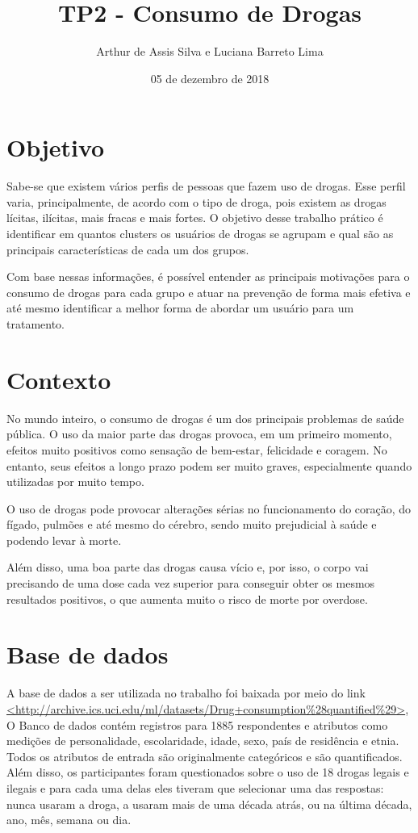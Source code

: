 \documentclass{article}
\title{TP2 - Consumo de Drogas}
\author{Arthur de Assis Silva e Luciana Barreto Lima}
\date{05 de dezembro de 2018}
\begin{document}
\maketitle

\section{Objetivo}

Sabe-se que existem vários perfis de pessoas que fazem uso de drogas. Esse perfil varia, principalmente, de acordo com o tipo de droga, pois existem as drogas lícitas, ilícitas, mais fracas e mais fortes. O objetivo desse trabalho prático é identificar em quantos clusters os usuários de drogas se agrupam e qual são as principais características de cada um dos grupos.

Com base nessas informações, é possível entender as principais motivações para o consumo de drogas para cada grupo e atuar na prevenção de forma mais efetiva e até mesmo identificar a melhor forma de abordar um usuário para um tratamento.  

\section{Contexto}

No mundo inteiro, o consumo de drogas é um dos principais problemas de saúde pública. O uso da maior parte das drogas provoca, em um primeiro momento, efeitos muito positivos como sensação de bem-estar, felicidade e coragem. No entanto, seus efeitos a longo prazo podem ser muito graves, especialmente quando utilizadas por muito tempo.

O uso de drogas pode provocar alterações sérias no funcionamento do coração, do fígado, pulmões e até mesmo do cérebro, sendo muito prejudicial à saúde e podendo levar à morte.

Além disso, uma boa parte das drogas causa vício e, por isso, o corpo vai precisando de uma dose cada vez superior para conseguir obter os mesmos resultados positivos, o que aumenta muito o risco de morte por overdose.

\section{Base de dados}\label{secao_base_dados}

A base de dados a ser utilizada no trabalho foi baixada por meio do link \url{<http://archive.ics.uci.edu/ml/datasets/Drug+consumption%28quantified%29>}, O Banco de dados contém registros para 1885 respondentes e atributos como medições de personalidade, escolaridade, idade, sexo, país de residência e etnia. Todos os atributos de entrada são originalmente categóricos e são quantificados. Além disso, os participantes foram questionados sobre o uso de 18 drogas legais e ilegais e para cada uma delas eles tiveram que selecionar uma das respostas: nunca usaram a droga, a usaram mais de uma década atrás, ou na última década, ano, mês, semana ou dia.
\end{document}
